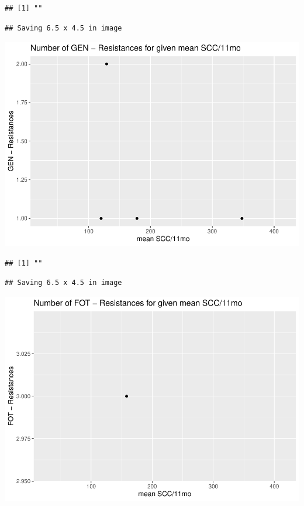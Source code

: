 \documentclass[
]{article}
\begin{document}
\begin{verbatim}
## [1] ""
\end{verbatim}

\begin{verbatim}
## Saving 6.5 x 4.5 in image
\end{verbatim}

\includegraphics{NResistenzen_files/figure-latex/numerical_variables-14.pdf}

\begin{verbatim}
## [1] ""
\end{verbatim}

\begin{verbatim}
## Saving 6.5 x 4.5 in image
\end{verbatim}

\includegraphics{NResistenzen_files/figure-latex/numerical_variables-15.pdf}
\end{document}
